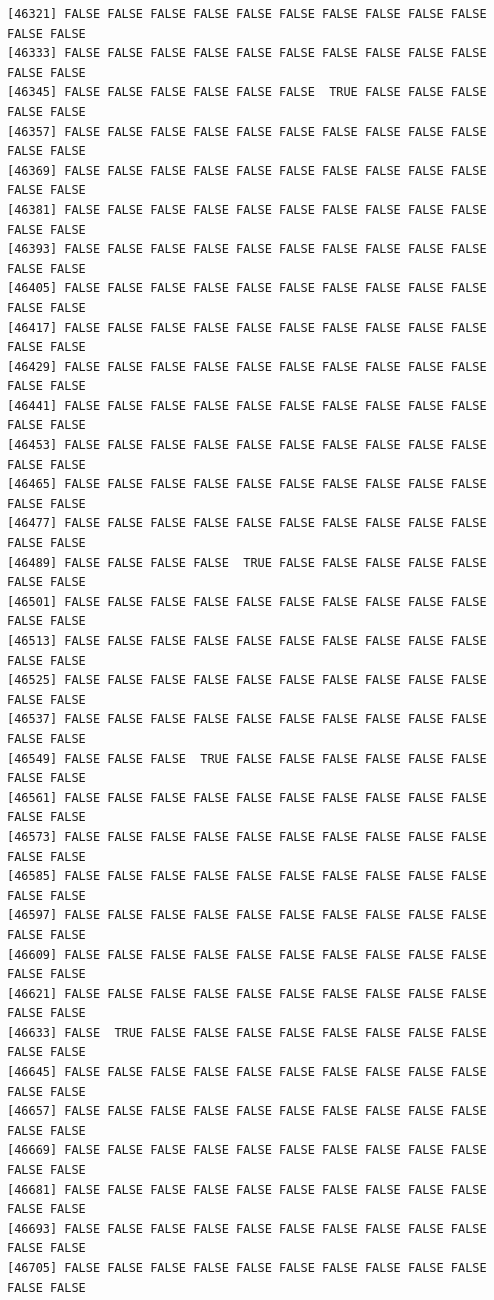 \documentclass[
  a4paper,
  DIV=11,
  numbers=noendperiod]{scrartcl}
\begin{document}
\begin{verbatim}
[46321] FALSE FALSE FALSE FALSE FALSE FALSE FALSE FALSE FALSE FALSE FALSE FALSE
[46333] FALSE FALSE FALSE FALSE FALSE FALSE FALSE FALSE FALSE FALSE FALSE FALSE
[46345] FALSE FALSE FALSE FALSE FALSE FALSE  TRUE FALSE FALSE FALSE FALSE FALSE
[46357] FALSE FALSE FALSE FALSE FALSE FALSE FALSE FALSE FALSE FALSE FALSE FALSE
[46369] FALSE FALSE FALSE FALSE FALSE FALSE FALSE FALSE FALSE FALSE FALSE FALSE
[46381] FALSE FALSE FALSE FALSE FALSE FALSE FALSE FALSE FALSE FALSE FALSE FALSE
[46393] FALSE FALSE FALSE FALSE FALSE FALSE FALSE FALSE FALSE FALSE FALSE FALSE
[46405] FALSE FALSE FALSE FALSE FALSE FALSE FALSE FALSE FALSE FALSE FALSE FALSE
[46417] FALSE FALSE FALSE FALSE FALSE FALSE FALSE FALSE FALSE FALSE FALSE FALSE
[46429] FALSE FALSE FALSE FALSE FALSE FALSE FALSE FALSE FALSE FALSE FALSE FALSE
[46441] FALSE FALSE FALSE FALSE FALSE FALSE FALSE FALSE FALSE FALSE FALSE FALSE
[46453] FALSE FALSE FALSE FALSE FALSE FALSE FALSE FALSE FALSE FALSE FALSE FALSE
[46465] FALSE FALSE FALSE FALSE FALSE FALSE FALSE FALSE FALSE FALSE FALSE FALSE
[46477] FALSE FALSE FALSE FALSE FALSE FALSE FALSE FALSE FALSE FALSE FALSE FALSE
[46489] FALSE FALSE FALSE FALSE  TRUE FALSE FALSE FALSE FALSE FALSE FALSE FALSE
[46501] FALSE FALSE FALSE FALSE FALSE FALSE FALSE FALSE FALSE FALSE FALSE FALSE
[46513] FALSE FALSE FALSE FALSE FALSE FALSE FALSE FALSE FALSE FALSE FALSE FALSE
[46525] FALSE FALSE FALSE FALSE FALSE FALSE FALSE FALSE FALSE FALSE FALSE FALSE
[46537] FALSE FALSE FALSE FALSE FALSE FALSE FALSE FALSE FALSE FALSE FALSE FALSE
[46549] FALSE FALSE FALSE  TRUE FALSE FALSE FALSE FALSE FALSE FALSE FALSE FALSE
[46561] FALSE FALSE FALSE FALSE FALSE FALSE FALSE FALSE FALSE FALSE FALSE FALSE
[46573] FALSE FALSE FALSE FALSE FALSE FALSE FALSE FALSE FALSE FALSE FALSE FALSE
[46585] FALSE FALSE FALSE FALSE FALSE FALSE FALSE FALSE FALSE FALSE FALSE FALSE
[46597] FALSE FALSE FALSE FALSE FALSE FALSE FALSE FALSE FALSE FALSE FALSE FALSE
[46609] FALSE FALSE FALSE FALSE FALSE FALSE FALSE FALSE FALSE FALSE FALSE FALSE
[46621] FALSE FALSE FALSE FALSE FALSE FALSE FALSE FALSE FALSE FALSE FALSE FALSE
[46633] FALSE  TRUE FALSE FALSE FALSE FALSE FALSE FALSE FALSE FALSE FALSE FALSE
[46645] FALSE FALSE FALSE FALSE FALSE FALSE FALSE FALSE FALSE FALSE FALSE FALSE
[46657] FALSE FALSE FALSE FALSE FALSE FALSE FALSE FALSE FALSE FALSE FALSE FALSE
[46669] FALSE FALSE FALSE FALSE FALSE FALSE FALSE FALSE FALSE FALSE FALSE FALSE
[46681] FALSE FALSE FALSE FALSE FALSE FALSE FALSE FALSE FALSE FALSE FALSE FALSE
[46693] FALSE FALSE FALSE FALSE FALSE FALSE FALSE FALSE FALSE FALSE FALSE FALSE
[46705] FALSE FALSE FALSE FALSE FALSE FALSE FALSE FALSE FALSE FALSE FALSE FALSE

\end{verbatim}
\end{document}
